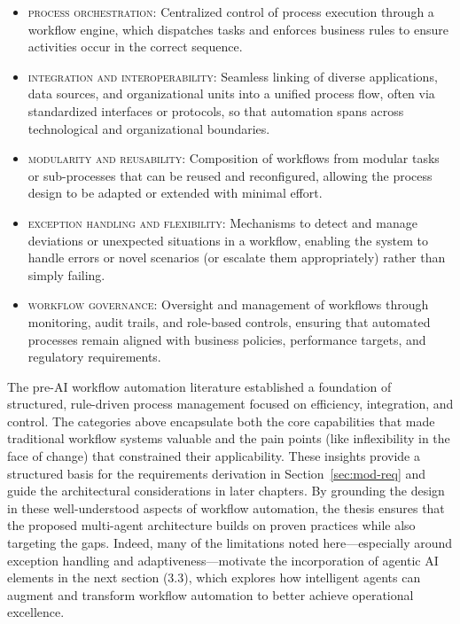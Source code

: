 \begin{itemize}
  \item \textsc{process orchestration:} Centralized control of process execution through a workflow engine, which dispatches tasks and enforces business rules to ensure activities occur in the correct sequence.
  \item \textsc{integration and interoperability:} Seamless linking of diverse applications, data sources, and organizational units into a unified process flow, often via standardized interfaces or protocols, so that automation spans across technological and organizational boundaries.
  \item \textsc{modularity and reusability:} Composition of workflows from modular tasks or sub-processes that can be reused and reconfigured, allowing the process design to be adapted or extended with minimal effort.
  \item \textsc{exception handling and flexibility:} Mechanisms to detect and manage deviations or unexpected situations in a workflow, enabling the system to handle errors or novel scenarios (or escalate them appropriately) rather than simply failing.
  \item \textsc{workflow governance:} Oversight and management of workflows through monitoring, audit trails, and role-based controls, ensuring that automated processes remain aligned with business policies, performance targets, and regulatory requirements.
\end{itemize}

The pre-AI workflow automation literature established a foundation of structured, rule-driven process management focused on efficiency, integration, and control. The categories above encapsulate both the core capabilities that made traditional workflow systems valuable and the pain points (like inflexibility in the face of change) that constrained their applicability. These insights provide a structured basis for the requirements derivation in Section~\ref{sec:mod-req} and guide the architectural considerations in later chapters. By grounding the design in these well-understood aspects of workflow automation, the thesis ensures that the proposed multi-agent architecture builds on proven practices while also targeting the gaps. Indeed, many of the limitations noted here---especially around exception handling and adaptiveness---motivate the incorporation of agentic AI elements in the next section (3.3), which explores how intelligent agents can augment and transform workflow automation to better achieve operational excellence.

